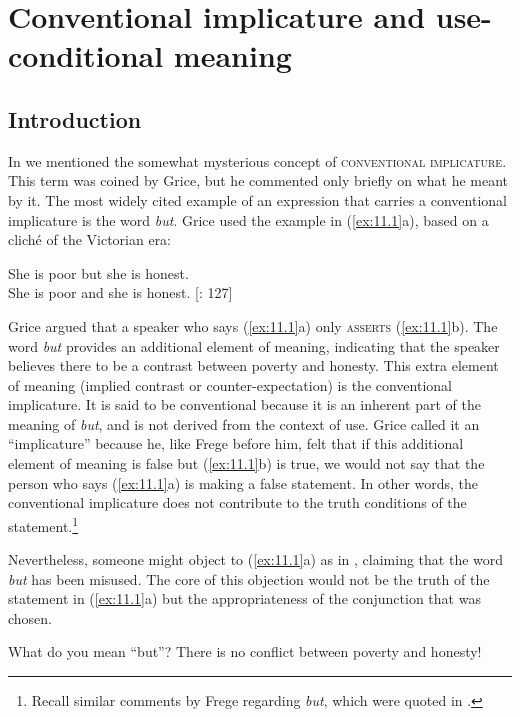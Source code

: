 \chapter{Conventional implicature and use-conditional meaning}\label{sec:11}

\section{Introduction}\label{sec:11.1}

In  we mentioned the somewhat mysterious concept of \textsc{conventional implicature}. This term was coined by Grice, but he commented only briefly on what he meant by it. The most widely cited example of an expression that carries a conventional implicature is the word \textit{but}. Grice used the example in (\ref{ex:11.1}a), based on a cliché of the Victorian era:


\ea \label{ex:11.1}
\ea She is poor but she is honest.\\
\ex She is poor and she is honest.  [\citealt{Grice1961}: 127]
                       \z
\z


Grice argued that a speaker who says (\ref{ex:11.1}a) only \textsc{asserts} (\ref{ex:11.1}b). The word \textit{but} provides an additional element of meaning, indicating that the speaker believes there to be a contrast between poverty and honesty. This extra element of meaning (implied contrast or counter-expectation) is the conventional implicature. It is said to be conventional because it is an inherent part of the meaning of \textit{but}, and is not derived from the context of use. Grice called it an “implicature” because he, like Frege before him, felt that if this additional element of meaning is false but (\ref{ex:11.1}b) is true, we would not say that the person who says (\ref{ex:11.1}a) is making a false statement. In other words, the conventional implicature does not contribute to the truth conditions of the statement.\footnote{Recall similar comments by Frege regarding \textit{but}, which were quoted in .}



Nevertheless, someone might object to (\ref{ex:11.1}a) as in , claiming that the word \textit{but} has been misused. The core of this objection would not be the truth of the statement in (\ref{ex:11.1}a) but the appropriateness of the conjunction that was chosen.


\ea \label{ex:11.2}
What do you mean “but”? There is no conflict between poverty and honesty!
\z


